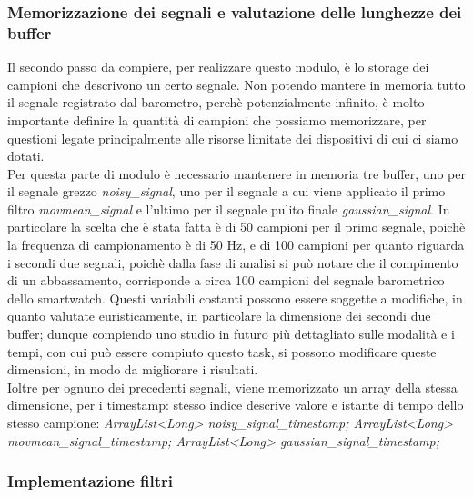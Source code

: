 \documentclass[a4paper]{article}
\begin{document}
\subsubsection{Memorizzazione dei segnali e valutazione delle lunghezze dei buffer}
Il secondo passo da compiere, per realizzare questo modulo, è lo storage dei campioni che descrivono un certo segnale. Non potendo mantere in memoria tutto il segnale registrato dal barometro, perchè potenzialmente infinito, è molto importante definire la quantità di campioni che possiamo memorizzare, per questioni legate principalmente alle risorse limitate dei dispositivi di cui ci siamo dotati. \\
Per questa parte di modulo è necessario mantenere in memoria tre buffer, uno per il segnale grezzo \textit{noisy\_signal}, uno per il segnale a cui viene applicato il primo filtro \textit{movmean\_signal} e l'ultimo per il segnale pulito finale \textit{gaussian\_signal}. In particolare la scelta che è stata fatta è di 50 campioni per il primo segnale, poichè la frequenza di campionamento è di 50 Hz, e di 100 campioni per quanto riguarda i secondi due segnali, poichè dalla fase di analisi si può notare che il compimento di un abbassamento, corrisponde a circa 100 campioni del segnale barometrico dello smartwatch. Questi variabili costanti possono essere soggette a modifiche, in quanto valutate euristicamente, in particolare la dimensione dei secondi due buffer; dunque compiendo uno studio in futuro più dettagliato sulle modalità e i tempi, con cui può essere compiuto questo task, si possono modificare queste dimensioni, in modo da migliorare i risultati. \\
 
\vspace{3mm}
Ioltre per ognuno dei precedenti segnali, viene memorizzato un array della stessa dimensione, per i timestamp: stesso indice descrive valore e istante di tempo dello stesso campione: \textit{ArrayList<Long> noisy\_signal\_timestamp; ArrayList<Long> movmean\_signal\_timestamp; ArrayList<Long> gaussian\_signal\_timestamp;}

\subsubsection{Implementazione filtri}
\vspace{2mm}

\vspace{5mm}

\end{document}
